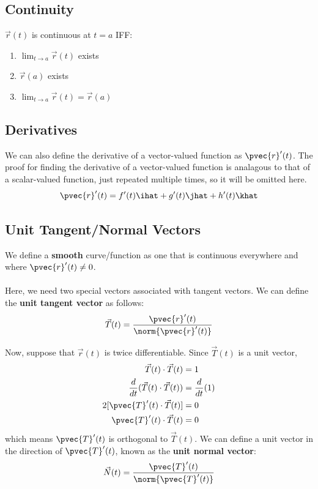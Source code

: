 \documentclass[12pt]{article}
\begin{document}
\subsection{Continuity}
$\vec{r}(t)$ is continuous at $t=a$ IFF:
\begin{enumerate}
\item $\displaystyle\lim_{t\rightarrow a}{\vec{r}(t)}$ exists
\item $\vec{r}(a)$ exists
\item $\displaystyle\lim_{t\rightarrow a}{\vec{r}(t)} = \vec{r}(a)$
\end{enumerate}

\subsection{Derivatives}
We can also define the derivative of a vector-valued function as $\pvec{r}'(t)$. The proof for finding the derivative of a vector-valued function is analagous to that of a scalar-valued function, just repeated multiple times, so it will be omitted here.
\[ \pvec{r}'(t) = f'(t)\ihat + g'(t)\jhat + h'(t)\khat \]

\subsection{Unit Tangent/Normal Vectors}
We define a \textbf{smooth} curve/function as one that is continuous everywhere and where $\pvec{r}'(t) \neq 0$. \\ \\
Here, we need two special vectors associated with tangent vectors. We can define the \textbf{unit tangent vector} as follows:
\[ \vec{T}(t) = \frac{\pvec{r}'(t)}{\norm{\pvec{r}'(t)}}\]

Now, suppose that $\vec{r}(t)$ is twice differentiable. Since $\vec{T}(t)$ is a unit vector,
\[
\begin{aligned}
\vec{T}(t) \cdot \vec{T}(t) &= 1 \\
\frac{d}{dt}(\vec{T}(t) \cdot \vec{T}(t)) &= \frac{d}{dt}(1) \\
2{[}\pvec{T}'(t) \cdot \vec{T}(t) {]} &= 0 \\
\pvec{T}'(t) \cdot \vec{T}(t) &= 0 \\
\end{aligned}
\]
which means $\pvec{T}'(t)$ is orthogonal to $\vec{T}(t)$. We can define a unit vector in the direction of $\pvec{T}'(t)$, known as the \textbf{unit normal vector}:
\[ \vec{N}(t) = \frac{\pvec{T}'(t)}{\norm{\pvec{T}'(t)}} \]
\end{document}
